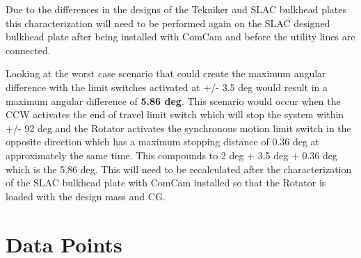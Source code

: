 \documentclass[SE,lsstdraft,authoryear,toc]{lsstdoc}
\begin{document}
Due to the differences in the designs of the Tekniker and SLAC bulkhead
plates this characterization will need to be performed again on the SLAC
designed bulkhead plate after being installed with ComCam and before the
utility lines are connected.

Looking at the worst case scenario that could create the maximum angular
difference with the limit switches activated at +/- 3.5 deg would result
in a maximum angular difference of \textbf{5.86 deg}. This scenario
would occur when the CCW activates the end of travel limit switch which
will stop the system within +/- 92 deg and the Rotator activates the
synchronous motion limit switch in the opposite direction which has a
maximum stopping distance of 0.36 deg at approximately the same time.
This compounds to 2 deg + 3.5 deg + 0.36 deg which is the 5.86 deg. This
will need to be recalculated after the characterization of the SLAC
bulkhead plate with ComCam installed so that the Rotator is loaded with
the design mass and CG.
\newpage
\appendix
\section{Data Points}
\end{document}
